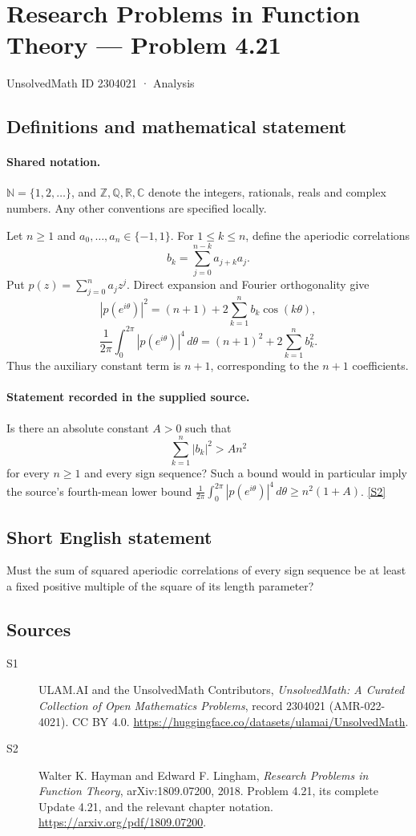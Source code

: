 \documentclass[11pt]{book}
\newcommand{\sref}[2]{\hyperlink{source:#1:#2}{[S#2]}}
\begin{document}
\setcounter{section}{2304020}
\section{Research Problems in Function Theory — Problem 4.21}\label{2304021}
{\small\sffamily UnsolvedMath ID 2304021 · Analysis}
\subsection{Definitions and mathematical statement}

\paragraph{Shared notation.}$\mathbb N=\{1,2,\ldots\}$, and $\mathbb Z,\mathbb Q,\mathbb R,\mathbb C$ denote the integers, rationals, reals and complex numbers. Any other conventions are specified locally.


Let $n\ge1$ and $a_0,\ldots,a_n\in\{-1,1\}$. For $1\le k\le n$, define the aperiodic correlations
\[b_k=\sum_{j=0}^{n-k}a_{j+k}a_j.
\]
Put $p(z)=\sum_{j=0}^na_jz^j$. Direct expansion and Fourier orthogonality give
\[|p(e^{i\theta})|^2=(n+1)+2\sum_{k=1}^nb_k\cos(k\theta),\]
\[\frac1{2\pi}\int_0^{2\pi}|p(e^{i\theta})|^4\,d\theta=(n+1)^2+2\sum_{k=1}^nb_k^2.
\]
Thus the auxiliary constant term is $n+1$, corresponding to the $n+1$ coefficients.
\paragraph{Statement recorded in the supplied source.}
Is there an absolute constant $A>0$ such that
\[\sum_{k=1}^n|b_k|^2>An^2\]
for every $n\ge1$ and every sign sequence? Such a bound would in particular imply the source's fourth-mean lower bound $\frac1{2\pi}\int_0^{2\pi}|p(e^{i\theta})|^4\,d\theta\ge n^2(1+A)$. \sref{2304021}{2}
\subsection{Short English statement}
Must the sum of squared aperiodic correlations of every sign sequence be at least a fixed positive multiple of the square of its length parameter?
\subsection{Sources}
\begin{description}
\item[\hypertarget{source:2304021:1}{S1}] ULAM.AI and the UnsolvedMath Contributors, \emph{UnsolvedMath: A Curated Collection of Open Mathematics Problems}, record 2304021 (AMR-022-4021). CC BY 4.0. \url{https://huggingface.co/datasets/ulamai/UnsolvedMath}.
\item[\hypertarget{source:2304021:2}{S2}] Walter K. Hayman and Edward F. Lingham, \emph{Research Problems in Function Theory}, arXiv:1809.07200, 2018. Problem 4.21, its complete Update 4.21, and the relevant chapter notation. \url{https://arxiv.org/pdf/1809.07200}.
\end{description}
\label{end:2304021}
\end{document}

